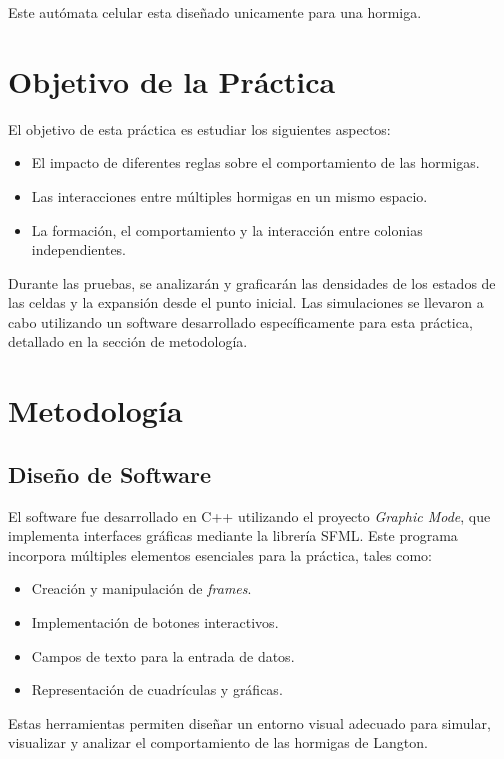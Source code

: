 \documentclass[12pt,twoside]{article}
\begin{document}
	Este autómata celular esta diseñado unicamente para una hormiga.
	
\section{Objetivo de la Práctica}

El objetivo de esta práctica es estudiar los siguientes aspectos:  
\begin{itemize}
	\item El impacto de diferentes reglas sobre el comportamiento de las hormigas.  
	\item Las interacciones entre múltiples hormigas en un mismo espacio.  
	\item La formación, el comportamiento y la interacción entre colonias independientes.  
\end{itemize}

Durante las pruebas, se analizarán y graficarán las densidades de los estados de las celdas y la expansión desde el punto inicial. Las simulaciones se llevaron a cabo utilizando un software desarrollado específicamente para esta práctica, detallado en la sección de metodología.

\section{Metodología}

\subsection{Diseño de Software}

El software fue desarrollado en C++ utilizando el proyecto \textit{Graphic Mode}, que implementa interfaces gráficas mediante la librería SFML. Este programa incorpora múltiples elementos esenciales para la práctica, tales como:  
\begin{itemize}
	\item Creación y manipulación de \textit{frames}.
	\item Implementación de botones interactivos.
	\item Campos de texto para la entrada de datos.
	\item Representación de cuadrículas y gráficas.
\end{itemize}

Estas herramientas permiten diseñar un entorno visual adecuado para simular, visualizar y analizar el comportamiento de las hormigas de Langton.
\end{document}
